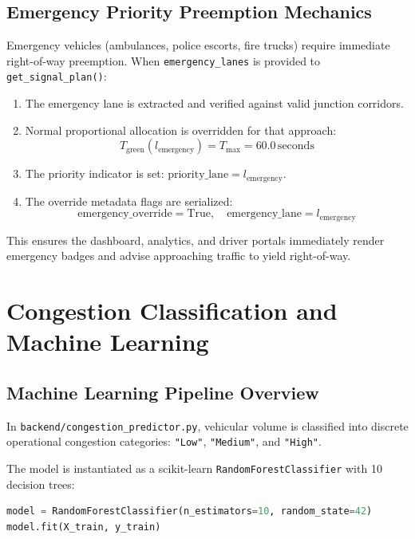 \documentclass[11pt,a4paper,oneside]{report}
\begin{document}
\section{Emergency Priority Preemption Mechanics}
Emergency vehicles (ambulances, police escorts, fire trucks) require immediate right-of-way preemption. When \texttt{emergency\_lanes} is provided to \texttt{get\_signal\_plan()}:
\begin{enumerate}
    \item The emergency lane is extracted and verified against valid junction corridors.
    \item Normal proportional allocation is overridden for that approach:
    \begin{equation}
    T_{\text{green}}(l_{\text{emergency}}) = T_{\text{max}} = 60.0\,\text{seconds}
    \end{equation}
    \item The priority indicator is set: $\text{priority\_lane} = l_{\text{emergency}}$.
    \item The override metadata flags are serialized:
    \begin{equation}
    \text{emergency\_override} = \text{True}, \quad \text{emergency\_lane} = l_{\text{emergency}}
    \end{equation}
\end{enumerate}
This ensures the dashboard, analytics, and driver portals immediately render emergency badges and advise approaching traffic to yield right-of-way.



\chapter{Congestion Classification and Machine Learning}

\section{Machine Learning Pipeline Overview}
In \texttt{backend/congestion\_predictor.py}, vehicular volume is classified into discrete operational congestion categories: \texttt{"Low"}, \texttt{"Medium"}, and \texttt{"High"}.

The model is instantiated as a scikit-learn \texttt{RandomForestClassifier} with 10 decision trees:
\begin{lstlisting}[language=Python]
model = RandomForestClassifier(n_estimators=10, random_state=42)
model.fit(X_train, y_train)
\end{lstlisting}
\end{document}
